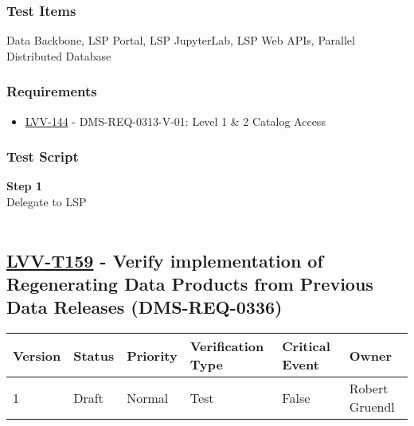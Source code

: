 \hypertarget{test-items-134}{%
\subsubsection{Test Items}\label{test-items-134}}

Data Backbone, LSP Portal, LSP JupyterLab, LSP Web APIs, Parallel
Distributed Database~

\hypertarget{requirements-135}{%
\subsubsection{Requirements}\label{requirements-135}}

\begin{itemize}
\tightlist
\item
  \href{https://jira.lsstcorp.org/browse/LVV-144}{LVV-144} -
  DMS-REQ-0313-V-01: Level 1 \& 2 Catalog Access
\end{itemize}

\hypertarget{test-script-135}{%
\subsubsection{Test Script}\label{test-script-135}}

\textbf{Step 1}\\
Delegate to LSP\\
~\\

\hypertarget{lvv-t159---verify-implementation-of-regenerating-data-products-from-previous-data-releases-dms-req-0336}{%
\subsection{\texorpdfstring{\href{https://jira.lsstcorp.org/secure/Tests.jspa\#/testCase/LVV-T159}{LVV-T159}
- Verify implementation of Regenerating Data Products from Previous Data
Releases
(DMS-REQ-0336)}{LVV-T159 - Verify implementation of Regenerating Data Products from Previous Data Releases (DMS-REQ-0336)}}\label{lvv-t159---verify-implementation-of-regenerating-data-products-from-previous-data-releases-dms-req-0336}}

\begin{longtable}[]{@{}llllll@{}}
\toprule
Version & Status & Priority & Verification Type & Critical Event &
Owner\tabularnewline
\midrule
\endhead
1 & Draft & Normal & Test & False & Robert Gruendl\tabularnewline
\bottomrule
\end{longtable}

